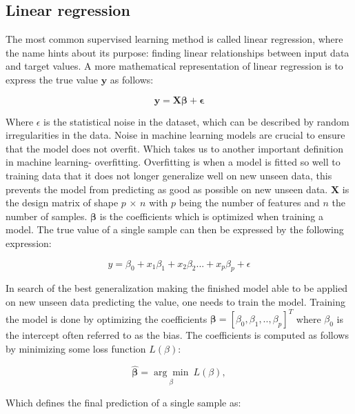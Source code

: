 \documentclass[../main.tex]{subfiles}
\begin{document}
\subsection{Linear regression}
The most common supervised learning method is called linear regression, where the name hints about its purpose: finding linear relationships between input data and target values. A more mathematical representation of linear regression is to express the true value \ensuremath{\mathbf{y}} as follows:

\begin{equation}
    \mathbf y=\mathbf X\mathbf \beta+\mathbf \epsilon
    \label{eq:linear regression}
\end{equation}

Where $\epsilon$ is the statistical noise in the dataset, which can be described by random irregularities in the data. Noise in machine learning models are crucial to ensure that the model does not overfit. Which takes us to another important definition in machine learning- overfitting. Overfitting is when a model is fitted so well to training data that it does not longer generalize well on new unseen data, this prevents the model from predicting as good as possible on new unseen data. \ensuremath{\mathbf{X}} is the design matrix of shape $p$ $\times$ $n$ with $p$ being the number of features and $n$ the number of samples. $\mathbf\beta$ is the coefficients which is optimized when training a model. The true value of a single sample can then be expressed by the following expression:

\begin{equation*}
    y=\beta_0+x_1\beta_1+x_2\beta_2...+x_{p}\beta_p+\epsilon
\end{equation*}

In search of the best generalization making the finished model able to be applied on new unseen data predicting the value, one needs to train the model. Training the model is done by optimizing the coefficients \ensuremath{\boldsymbol{\beta}=[\beta_0, \beta_1,..,\beta_p]^T} where $\beta_0$ is the intercept often referred to as the bias. The coefficients is computed as follows by minimizing some loss function $L(\beta)$:

\begin{equation}
  \hat{\mathbf \beta} = \underset{\beta}{\arg \min}\ L(\beta),
\end{equation}

Which defines the final prediction of a single sample as:
\end{document}
